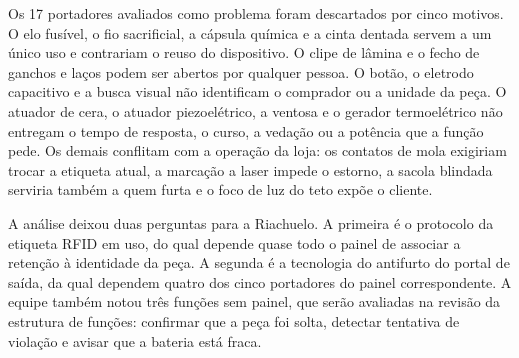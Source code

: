 Os 17 portadores avaliados como problema foram descartados por cinco motivos. O elo fusível, o fio sacrificial, a cápsula química e a cinta dentada servem a um único uso e contrariam o reuso do dispositivo. O clipe de lâmina e o fecho de ganchos e laços podem ser abertos por qualquer pessoa. O botão, o eletrodo capacitivo e a busca visual não identificam o comprador ou a unidade da peça. O atuador de cera, o atuador piezoelétrico, a ventosa e o gerador termoelétrico não entregam o tempo de resposta, o curso, a vedação ou a potência que a função pede. Os demais conflitam com a operação da loja: os contatos de mola exigiriam trocar a etiqueta atual, a marcação a laser impede o estorno, a sacola blindada serviria também a quem furta e o foco de luz do teto expõe o cliente.

A análise deixou duas perguntas para a Riachuelo. A primeira é o protocolo da etiqueta RFID em uso, do qual depende quase todo o painel de associar a retenção à identidade da peça. A segunda é a tecnologia do antifurto do portal de saída, da qual dependem quatro dos cinco portadores do painel correspondente. A equipe também notou três funções sem painel, que serão avaliadas na revisão da estrutura de funções: confirmar que a peça foi solta, detectar tentativa de violação e avisar que a bateria está fraca.